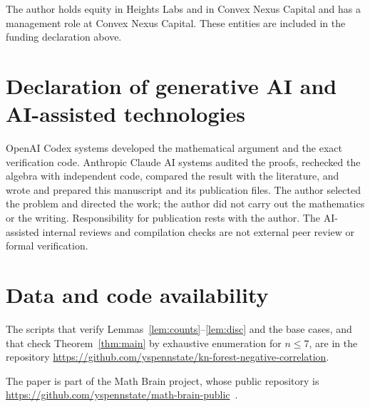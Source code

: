 \documentclass[11pt]{amsart}
\theoremstyle{remark}
\begin{document}
The author holds equity in Heights Labs and in Convex Nexus Capital and has a management role at Convex Nexus Capital. These entities are included in the funding declaration above.

\section*{Declaration of generative AI and AI-assisted technologies}

OpenAI Codex systems developed the mathematical argument and the exact verification code. Anthropic Claude AI systems audited the proofs, rechecked the algebra with independent code, compared the result with the literature, and wrote and prepared this manuscript and its publication files. The author selected the problem and directed the work; the author did not carry out the mathematics or the writing. Responsibility for publication rests with the author. The AI-assisted internal reviews and compilation checks are not external peer review or formal verification.

\section*{Data and code availability}

The scripts that verify Lemmas~\ref{lem:counts}--\ref{lem:disc} and the base cases, and
that check Theorem~\ref{thm:main} by exhaustive enumeration for $n\le7$, are in the
repository
\url{https://github.com/yspennstate/kn-forest-negative-correlation}.

The paper is part of the Math Brain project, whose public repository is \url{https://github.com/yspennstate/math-brain-public}~\cite{MathBrainRepo}.
\end{document}
